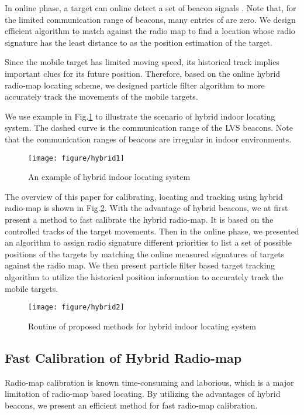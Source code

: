 \documentclass[conference, 10pt]{IEEEtran}
\begin{document}
In online phase, a target can online detect a set of beacon signals .  Note that, for the limited communication range of beacons, many entries of  are zero. We design efficient algorithm to match  against the radio map to find a location  whose radio signature has the least distance to   as the position estimation of the target. 

Since the mobile target has limited moving speed, its historical track implies important clues for its future position. Therefore, based on the online hybrid radio-map locating scheme, we designed particle filter algorithm to more accurately track the movements of the mobile targets. 

 
We use example in Fig.\ref{fig1} to illustrate the scenario of  hybrid indoor locating system.  The dashed curve is the communication range of the LVS beacons. Note that the communication ranges of beacons are irregular in indoor environments. 
\begin{figure}[t]
\begin{center}
\texttt{[image: figure/hybrid1]}
\caption{An example of hybrid indoor locating system}
\label{fig1}
\end{center}
\end{figure}

The overview of this paper for calibrating, locating and tracking using hybrid radio-map is shown in Fig.\ref{fig2}.  With the advantage of hybrid beacons, we at first present a method to fast calibrate the hybrid radio-map. It is based on the controlled tracks of the target movements. Then in the online phase, we presented an algorithm to assign radio signature different priorities to list a set of possible positions of the targets by matching the online measured signatures of targets against the radio map. We then present particle filter based target tracking algorithm to utilize the historical position information to accurately track the mobile targets.  

\begin{figure}[t]
\begin{center}
\texttt{[image: figure/hybrid2]}
\caption{Routine of proposed methods for hybrid indoor locating system}
\label{fig2}
\end{center}
\end{figure}
\subsection{Fast Calibration of Hybrid Radio-map}
Radio-map calibration is known time-consuming and laborious, which is a major limitation of radio-map based locating.  By utilizing the advantages of hybrid beacons, we present an efficient method for fast radio-map calibration. 
\end{document}
